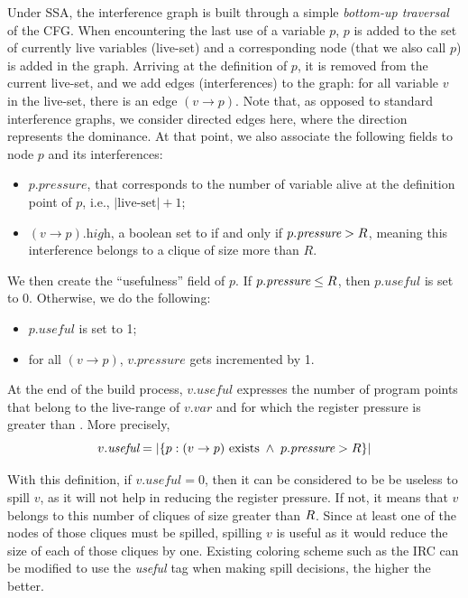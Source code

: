 {Under SSA, the interference graph is built through a simple \emph{bottom-up traversal} of the CFG.
When encountering the last use of a variable $p$, $p$ is added to the set of currently live variables (live-set) and a corresponding node (that we also call $p$) is added in the graph.
Arriving at the definition of $p$, it is removed from the current live-set, and we add edges (interferences) to the graph:
for all variable $v$ in the live-set, there is an edge $(v\to p)$.
Note that, as opposed to standard interference graphs, we consider directed edges here, where the direction represents the dominance.
At that point, we also associate the following fields to node $p$ and its interferences: 
\begin{itemize}
  \item $p.\textit{pressure}$, that corresponds to the number of variable alive at the definition point of $p$, i.e., $|\textrm{live-set}| + 1$;
  \item $(v\to p).\textit{high}$, a boolean set to \true if and only if $p.\textit{pressure}>R$, meaning this interference belongs to a clique of size more than $R$.
\end{itemize}

We then create the ``usefulness'' field of $p$. If $p.\textit{pressure} \leq R$, then $p.\textit{useful}$ is set to 0. Otherwise, we do the following:
\begin{itemize}
  \item $p.\textit{useful}$ is set to 1;
  \item for all $(v\to p)$, $v.\textit{pressure}$ gets incremented by 1.
\end{itemize}

At the end of the build process, $v.\textit{useful}$ expresses the number of program points that belong to the live-range of $v.\textit{var}$ and for which the register pressure is greater than \regs. 
More precisely,
%
$$v.\textit{useful}=\left|\lbrace p : (v\to p)\ \textrm{exists}\; \wedge\; p.\textit{pressure}>R  \rbrace\right|$$

With this definition, if $v.\textit{useful}=0$, then it can be considered to be be useless to spill $v$, as it will not help in reducing the register pressure.
If not, it means that $v$ belongs to this number of cliques of size greater than $R$.
Since at least one of the nodes of those cliques must be spilled, spilling $v$ is useful as it would reduce the size of each of those cliques by one.
Existing coloring scheme such as the IRC can be modified to use the \emph{useful} tag when making spill decisions, the higher the better.


}
